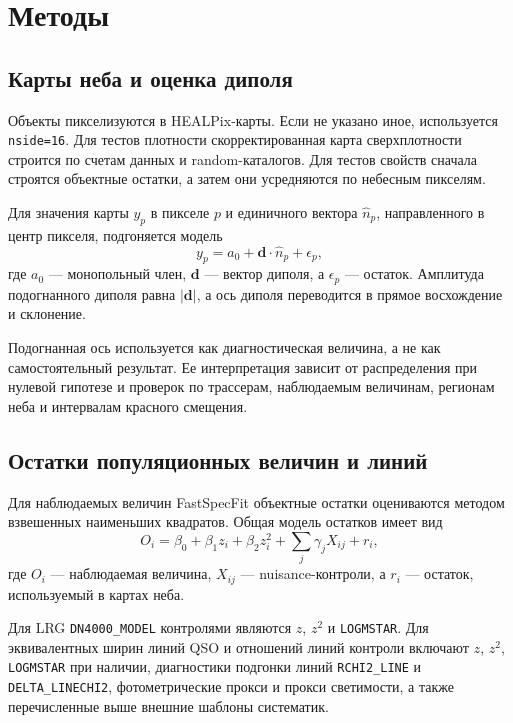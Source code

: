 \documentclass[11pt]{article}
\begin{document}
\section{Методы}

\subsection{Карты неба и оценка диполя}

Объекты пикселизуются в HEALPix-карты. Если не указано иное, используется \texttt{nside=16}. Для тестов плотности скорректированная карта сверхплотности строится по счетам данных и random-каталогов. Для тестов свойств сначала строятся объектные остатки, а затем они усредняются по небесным пикселям.

Для значения карты $y_p$ в пикселе $p$ и единичного вектора $\hat{n}_p$, направленного в центр пикселя, подгоняется модель
\begin{equation}
    y_p = a_0 + \mathbf{d}\cdot \hat{n}_p + \epsilon_p ,
\end{equation}
где $a_0$ — монопольный член, $\mathbf{d}$ — вектор диполя, а $\epsilon_p$ — остаток. Амплитуда подогнанного диполя равна $|\mathbf{d}|$, а ось диполя переводится в прямое восхождение и склонение.

Подогнанная ось используется как диагностическая величина, а не как самостоятельный результат. Ее интерпретация зависит от распределения при нулевой гипотезе и проверок по трассерам, наблюдаемым величинам, регионам неба и интервалам красного смещения.

\subsection{Остатки популяционных величин и линий}

Для наблюдаемых величин FastSpecFit объектные остатки оцениваются методом взвешенных наименьших квадратов. Общая модель остатков имеет вид
\begin{equation}
    O_i = \beta_0 + \beta_1 z_i + \beta_2 z_i^2 + \sum_j \gamma_j X_{ij} + r_i ,
\end{equation}
где $O_i$ — наблюдаемая величина, $X_{ij}$ — nuisance-контроли, а $r_i$ — остаток, используемый в картах неба.

Для LRG \texttt{DN4000\_MODEL} контролями являются $z$, $z^2$ и \texttt{LOGMSTAR}. Для эквивалентных ширин линий QSO и отношений линий контроли включают $z$, $z^2$, \texttt{LOGMSTAR} при наличии, диагностики подгонки линий \texttt{RCHI2\_LINE} и \texttt{DELTA\_LINECHI2}, фотометрические прокси и прокси светимости, а также перечисленные выше внешние шаблоны систематик.
\end{document}
